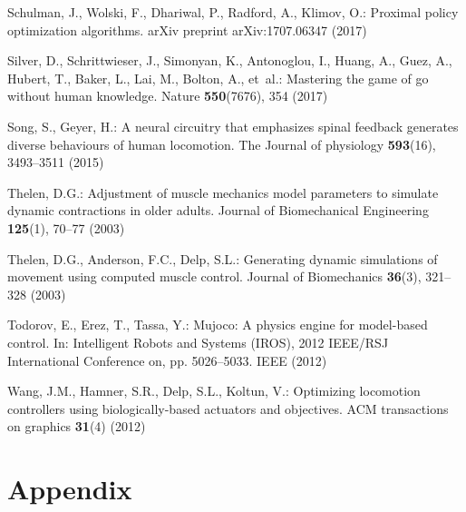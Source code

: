\documentclass[graybox]{svmult}
\begin{document}
\begin{thebibliography}{10}
Schulman, J., Wolski, F., Dhariwal, P., Radford, A., Klimov, O.: Proximal
  policy optimization algorithms.
\newblock arXiv preprint arXiv:1707.06347  (2017)

Silver, D., Schrittwieser, J., Simonyan, K., Antonoglou, I., Huang, A., Guez,
  A., Hubert, T., Baker, L., Lai, M., Bolton, A., et~al.: Mastering the game of
  go without human knowledge.
\newblock Nature \textbf{550}(7676), 354 (2017)

Song, S., Geyer, H.: A neural circuitry that emphasizes spinal feedback
  generates diverse behaviours of human locomotion.
\newblock The Journal of physiology \textbf{593}(16), 3493--3511 (2015)

Thelen, D.G.: Adjustment of muscle mechanics model parameters to simulate
  dynamic contractions in older adults.
\newblock Journal of Biomechanical Engineering \textbf{125}(1), 70--77 (2003)

Thelen, D.G., Anderson, F.C., Delp, S.L.: Generating dynamic simulations of
  movement using computed muscle control.
\newblock Journal of Biomechanics \textbf{36}(3), 321--328 (2003)

Todorov, E., Erez, T., Tassa, Y.: Mujoco: A physics engine for model-based
  control.
\newblock In: Intelligent Robots and Systems (IROS), 2012 IEEE/RSJ
  International Conference on, pp. 5026--5033. IEEE (2012)

Wang, J.M., Hamner, S.R., Delp, S.L., Koltun, V.: Optimizing locomotion
  controllers using biologically-based actuators and objectives.
\newblock ACM transactions on graphics \textbf{31}(4) (2012)

\end{thebibliography}

\appendix
\section{Appendix}\label{appendix}
\end{document}
